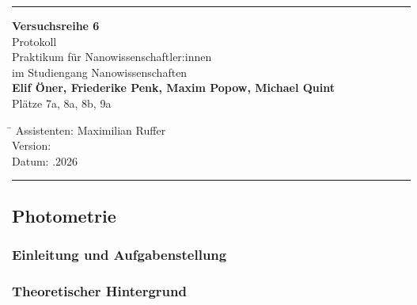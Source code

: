 \documentclass[
	a4paper,										%
	12pt,											%
	twoside,										%
	headsepline,								%
	footsepline,									%
	captions=tableheading,					%
]{scrartcl}
\begin{document}
	
	\begin{titlepage}
		\begin{center}
			\hrule													%
			\vspace*{5cm}
			\Huge {\textbf {Versuchsreihe 6}}\\						%
			\vspace*{0.5cm}
			\vspace*{1cm}
			\normalsize
			Protokoll	\\									
			Praktikum für Nanowissenschaftler:innen\\
			im Studiengang Nanowissenschaften\\
			\vspace*{0.5cm}
			\Large {\textbf{Elif Öner, Friederike Penk, Maxim Popow, Michael Quint}}		\\						%
			\vspace*{0.5cm}
					\normalsize{Plätze 7a, 8a, 8b, 9a}								%
			\vfill
		\end{center}
		\begin{tabbing}
			\hspace{3cm}\=\kill
			Assistenten: \>Maximilian Ruffer \\						%
			Version:  \\									%
			Datum: .2026 \\								%
		\end{tabbing}
		\hrule														%
\end{titlepage}

\setcounter{page}{1}
\setcounter{section}{8}								%
\setcounter{subsection}{0}							%
\setcounter{secnumdepth}{4}
	
\subsection{Photometrie}

\subsubsection{Einleitung und Aufgabenstellung}

\subsubsection{Theoretischer Hintergrund}
\end{document}
